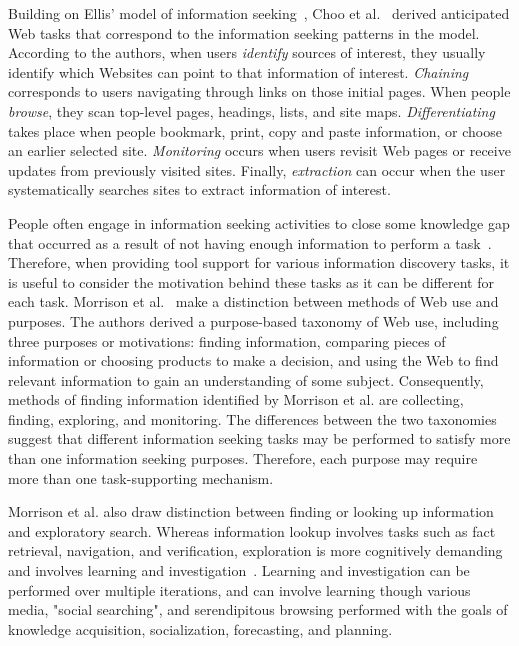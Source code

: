 {{{Building on Ellis' model of information seeking~\cite{ellis1989behavioural,ellis1993comparison,ellis1997modelling}, Choo et al.~\cite{choo2000information} derived anticipated Web tasks that correspond to the information seeking patterns in the model. According to the authors, when users \textit{identify} sources of interest, they usually identify which Websites can point to that information of interest.  \textit{Chaining} corresponds to users navigating through links on those initial pages. When people \textit{browse}, they scan top-level pages, headings, lists, and site maps. \textit{Differentiating} takes place when people bookmark, print, copy and paste information, or choose an earlier selected site. \textit{Monitoring} occurs when users revisit Web pages or receive updates from previously visited sites. Finally, \textit{extraction} can occur when the user systematically searches sites to extract information of interest.  

People often engage in information seeking activities to close some knowledge gap that occurred as a result of not having enough information to perform a task~\cite{proper1999information}. Therefore, when providing tool support for various information discovery tasks, it is useful to consider the motivation behind these tasks as it can be different for each task. Morrison et al.~\cite{morrison2001taxonomic} make a distinction between methods of Web use and purposes. The authors derived a purpose-based taxonomy of Web use, including three purposes or motivations: finding information, comparing pieces of information or choosing products to make a decision, and using the Web to find relevant information to gain an understanding of some subject. Consequently, methods of finding information identified by Morrison et al. are collecting, finding, exploring, and monitoring. The differences between the two taxonomies suggest that different information seeking tasks may be performed to satisfy more than one information seeking purposes. Therefore, each purpose may require more than one task-supporting mechanism. 

Morrison et al. also draw distinction between finding or looking up information and exploratory search. Whereas information lookup involves tasks such as fact retrieval, navigation, and verification, exploration is more cognitively demanding and involves learning and investigation~\cite{marchionini2006exploratory}. Learning and investigation can be performed over multiple iterations, and can involve learning though various media, "social searching", and serendipitous browsing performed with the goals of knowledge acquisition, socialization, forecasting, and planning.  

}}}

